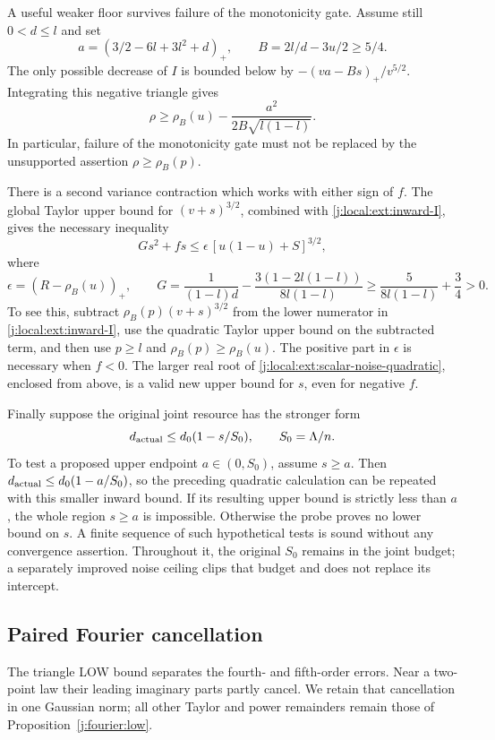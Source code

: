 A useful weaker floor survives failure of the monotonicity gate.
Assume still $0<d\le l$ and set
\[
 a=(3/2-6l+3l^2+d)_+,
 \qquad B=2l/d-3u/2\ge5/4.
\]
The only possible decrease of $I$ is bounded below by
$-(va-Bs)_+/v^{5/2}$. Integrating this negative triangle gives
\begin{equation}\label{j:local:ext:inward-deficit}
 \rho\ge\rho_B(u)-\frac{a^2}{2B\sqrt{l(1-l)}}.
\end{equation}
In particular, failure of the monotonicity gate must not be replaced
by the unsupported assertion $\rho\ge\rho_B(p)$.

There is a second variance contraction which works with either sign
of $f$. The global Taylor upper bound for $(v+s)^{3/2}$, combined
with \eqref{j:local:ext:inward-I}, gives the necessary inequality
\begin{equation}\label{j:local:ext:scalar-noise-quadratic}
 Gs^2+fs\le\epsilon\,[u(1-u)+S]^{3/2},
\end{equation}
where
\[
 \epsilon=(R-\rho_B(u))_+,\qquad
 G=\frac1{(1-l)d}-\frac{3(1-2l(1-l))}{8l(1-l)}
       \ge\frac5{8l(1-l)}+\frac34>0.
\]
To see this, subtract $\rho_B(p)(v+s)^{3/2}$ from the lower
numerator in \eqref{j:local:ext:inward-I}, use the quadratic Taylor upper
bound on the subtracted term, and then use $p\ge l$ and
$\rho_B(p)\ge\rho_B(u)$. The positive part in $\epsilon$ is
necessary when $f<0$. The larger real root of
\eqref{j:local:ext:scalar-noise-quadratic}, enclosed from above, is a valid
new upper bound for $s$, even for negative $f$.

Finally suppose the original joint resource has the stronger form
\[
 d_{\rm actual}\le d_0(1-s/S_0),\qquad S_0=\Lambda/n.
\]
To test a proposed upper endpoint $a\in(0,S_0)$, assume $s\ge a$.
Then $d_{\rm actual}\le d_0(1-a/S_0)$, so the preceding quadratic
calculation can be repeated with this smaller inward bound. If its
resulting upper bound is strictly less than $a$, the whole region
$s\ge a$ is impossible. Otherwise the probe proves no lower bound
on $s$. A finite sequence of such hypothetical tests is sound
without any convergence assertion. Throughout it, the original
$S_0$ remains in the joint budget; a separately improved noise
ceiling clips that budget and does not replace its intercept.


\subsection{Paired Fourier cancellation}
\label{j:local:paired}
The triangle LOW bound separates the fourth- and fifth-order errors.
Near a two-point law their leading imaginary parts partly cancel.
We retain that cancellation in one Gaussian norm; all other Taylor and
power remainders remain those of Proposition~\ref{j:fourier:low}.

